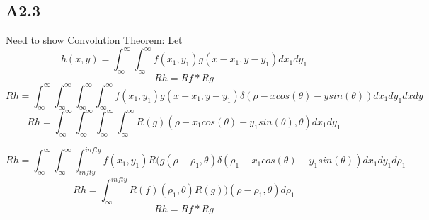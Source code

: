 \documentclass{article}
\newcommand{\dbint}{
  \int_{\infty}^{\infty}\int_{\infty}^{\infty}
}
\begin{document}
\subsection*{A2.3}
Need to show Convolution Theorem:
Let $$h(x,y) = \dbint f(x_1,y_1)g(x - x_1,y - y_1)dx_1dy_1$$
\begin{equation}
  \label{eq:3}
  Rh = Rf * Rg
\end{equation}
$$Rh = \dbint\dbint f(x_1,y_1)g(x-x_1,y-y_1)\delta(\rho - xcos(\theta) - ysin(\theta))dx_1dy_1dxdy$$
$$Rh = \dbint \dbint R(g)(\rho - x_1cos(\theta) - y_1sin(\theta),\theta) dx_1dy_1$$

$$Rh = \dbint \int_{infty}^{infty}f(x_1,y_1)R(g(\rho-\rho_1,\theta)\delta(\rho_1 - x_1cos(\theta) - y_1sin(\theta))dx_1dy_1d\rho_1$$
$$Rh = \int_{\infty}^{infty}R(f)(\rho_1,\theta)R(g))(\rho - \rho_1,\theta)d\rho_1$$
$$Rh = Rf * Rg$$
\end{document}
